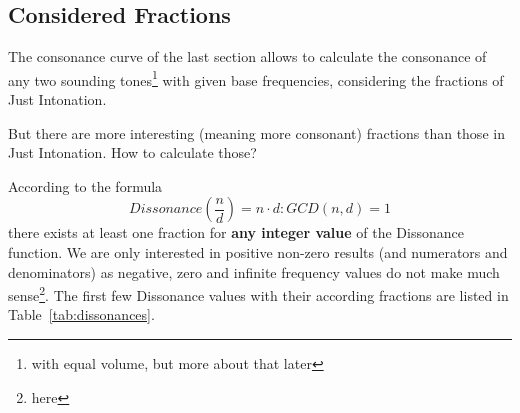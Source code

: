\documentclass[12pt,a4paper,titlepage,oneside]{report}
\begin{document}
\subsection{Considered Fractions}

The consonance curve of the last section allows to calculate the consonance of any two sounding tones\footnote{with equal volume, but more about that later} with given base frequencies, considering the fractions of Just Intonation.

But there are more interesting (meaning more consonant) fractions than those in Just Intonation. How to calculate those?

According to the formula 
\[Dissonance(\frac{n}{d}) = n \cdot d : GCD(n,d) = 1\]
there exists at least one fraction for \textbf{any integer value} of the Dissonance function. We are only interested in positive non-zero results (and numerators and denominators) as negative, zero and infinite frequency values do not make much sense\footnote{here}. The first few Dissonance values with their according fractions are listed in Table~\ref{tab:dissonances}.
\end{document}
